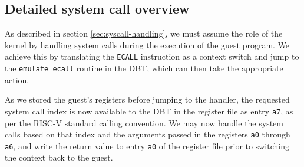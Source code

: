 \subsection{Detailed system call overview}

As described in section \vref{sec:syscall-handling}, we must assume the role of the kernel by handling system calls during the execution of the guest program.
We achieve this by translating the \texttt{ECALL} instruction as a context switch and jump to the \texttt{emulate\_ecall} routine in the DBT, which can then take the appropriate action.

As we stored the guest's registers before jumping to the handler, the requested system call index is now available to the DBT in the register file as entry \texttt{a7}, as per the RISC-V standard calling convention.
We may now handle the system calls based on that index and the arguments passed in the registers \texttt{a0} through \texttt{a6}, and write the return value to entry \texttt{a0} of the register file prior to switching the context back to the guest.

